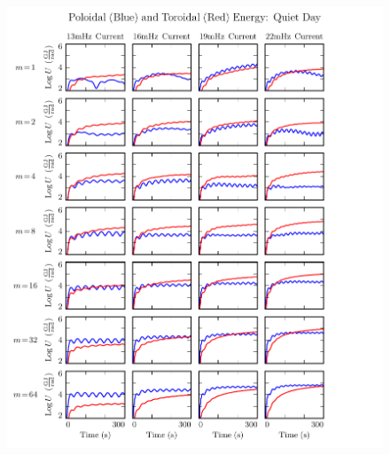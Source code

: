 \begin{figure}[!htb]
    \centering
    \includegraphics[width=\textwidth]{figures/U_day.pdf}
    \caption[Dayside Poloidal and Toroidal Energy]{
      \todo{$\cdots$}
    }
    \label{fig_U_day}
\end{figure}


